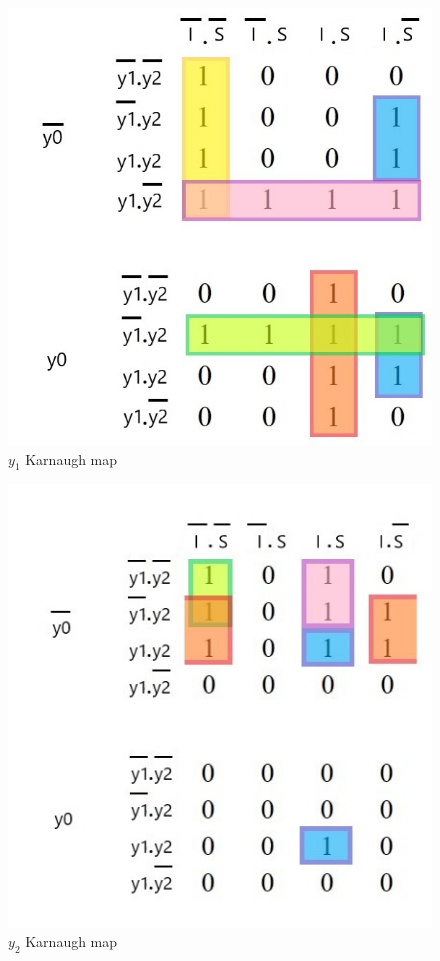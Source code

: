 \documentclass[../../e3_tp3_main.tex]{subfiles}
\begin{document}
\begin{figure}[H]
	\centering
	\includegraphics[scale=0.8]{figures/e3_tp3_ej1_moore_y1_kmap.jpg}
	\caption{$y_1$ Karnaugh map}
\end{figure}

\begin{figure}[H]
	\centering
	\includegraphics[scale=1]{figures/e3_tp3_ej1_moore_y2_kmap.jpg}
	\caption{$y_2$ Karnaugh map}
\end{figure}
\end{document}
